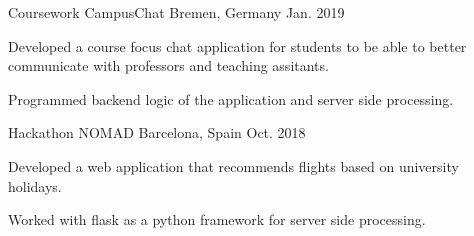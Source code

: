 

\begin{cventries}

  \cventry
    {Coursework} %
    {CampusChat} %
    {Bremen, Germany} %
    {Jan. 2019} %
    {
      \begin{cvitems} %
        \item {Developed a course focus chat application for students to be able to better communicate with professors and teaching assitants.}
        \item {Programmed backend logic of the application and server side processing.}
      \end{cvitems}
    }
  \cventry
    {Hackathon} %
    {NOMAD} %
    {Barcelona, Spain} %
    {Oct. 2018} %
    {
      \begin{cvitems} %
        \item {Developed a web application that recommends flights based on university holidays.}
        \item {Worked with flask as a python framework for server side processing.}
      \end{cvitems}
    }
\end{cventries}

